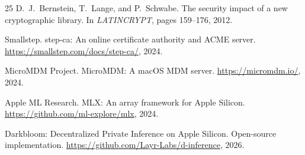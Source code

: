 \documentclass[10pt,twocolumn,letterpaper]{article}
\begin{document}
\begin{thebibliography}{25}
D.~J.~Bernstein, T.~Lange, and P.~Schwabe. The security impact of a new cryptographic library. In \emph{LATINCRYPT}, pages 159--176, 2012.

Smallstep. step-ca: An online certificate authority and ACME server. \url{https://smallstep.com/docs/step-ca/}, 2024.

MicroMDM Project. MicroMDM: A macOS MDM server. \url{https://micromdm.io/}, 2024.

Apple ML Research. MLX: An array framework for Apple Silicon. \url{https://github.com/ml-explore/mlx}, 2024.

Darkbloom: Decentralized Private Inference on Apple Silicon. Open-source implementation. \url{https://github.com/Layr-Labs/d-inference}, 2026.

\end{thebibliography}
\end{document}
